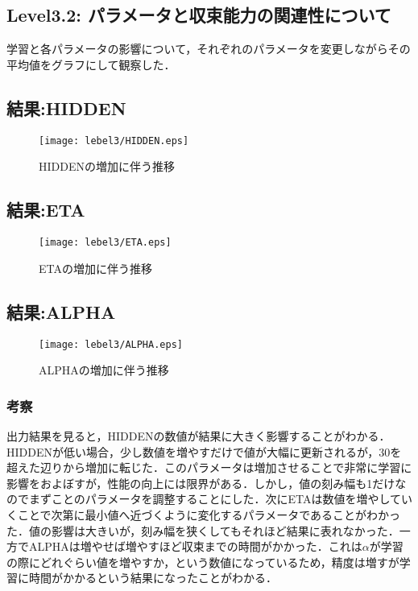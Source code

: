 \subsection{Level3.2: パラメータと収束能力の関連性について}
学習と各パラメータの影響について，それぞれのパラメータを変更しながらその平均値をグラフにして観察した．
\subsection{結果:HIDDEN}
\begin{figure}[h]
 \begin{center}
  \texttt{[image: lebel3/HIDDEN.eps]}
  \caption{HIDDENの増加に伴う推移}
  \label{hidden}
 \end{center}
\end{figure} 

\subsection{結果:ETA}
\begin{figure}[h]
 \begin{center}
  \texttt{[image: lebel3/ETA.eps]}
  \caption{ETAの増加に伴う推移}
  \label{eta}
 \end{center}
\end{figure} 
	
\subsection{結果:ALPHA}
\begin{figure}[h]
 \begin{center}
  \texttt{[image: lebel3/ALPHA.eps]}
  \caption{ALPHAの増加に伴う推移}
  \label{alpha}
 \end{center}
\end{figure}  
\subsubsection{考察}
出力結果を見ると，HIDDENの数値が結果に大きく影響することがわかる．HIDDENが低い場合，少し数値を増やすだけで値が大幅に更新されるが，30を超えた辺りから増加に転じた．このパラメータは増加させることで非常に学習に影響をおよぼすが，性能の向上には限界がある．しかし，値の刻み幅も1だけなのでまずことのパラメータを調整することにした．次にETAは数値を増やしていくことで次第に最小値へ近づくように変化するパラメータであることがわかった．値の影響は大きいが，刻み幅を狭くしてもそれほど結果に表れなかった．一方でALPHAは増やせば増やすほど収束までの時間がかかった．これは$\alpha$が学習の際にどれぐらい値を増やすか，という数値になっているため，精度は増すが学習に時間がかかるという結果になったことがわかる．

